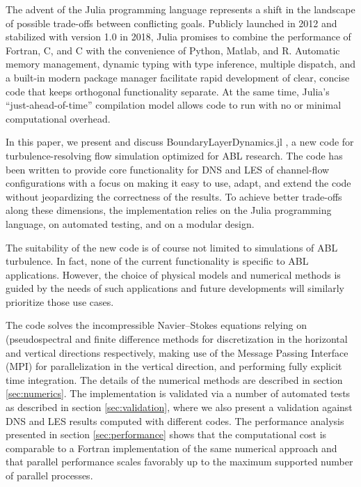 \documentclass[gmd, manuscript]{copernicus}
\begin{document}
The advent of the Julia programming language \citep{Bezanson+2017} represents a shift in the landscape of possible trade-offs between conflicting goals.
Publicly launched in 2012 and stabilized with version 1.0 in 2018, Julia promises to combine the performance of Fortran, C, and C\hspace{-.02ex}\raisebox{.3ex}{\textbf{\scriptsize ++}} with the convenience of Python, Matlab, and R.
Automatic memory management, dynamic typing with type inference, multiple dispatch, and a built-in modern package manager facilitate rapid development of clear, concise code that keeps orthogonal functionality separate.
At the same time, Julia's ``just-ahead-of-time'' compilation model allows code to run with no or minimal computational overhead.

In this paper, we present and discuss BoundaryLayerDynamics.jl \citep{Schmid2023a}, a new code for turbulence-resolving flow simulation optimized for ABL research.
The code has been written to provide core functionality for DNS and LES of channel-flow configurations with a focus on making it easy to use, adapt, and extend the code without jeopardizing the correctness of the results.
To achieve better trade-offs along these dimensions, the implementation relies on the Julia programming language, on automated testing, and on a modular design.

The suitability of the new code is of course not limited to simulations of ABL turbulence.
In fact, none of the current functionality is specific to ABL applications.
However, the choice of physical models and numerical methods is guided by the needs of such applications and future developments will similarly prioritize those use cases.

The code solves the incompressible Navier--Stokes equations relying on (pseudo\discretionary{-)}{}{)}spectral and finite difference methods for discretization in the horizontal and vertical directions respectively, making use of the Message Passing Interface (MPI) for parallelization in the vertical direction, and performing fully explicit time integration.
The details of the numerical methods are described in section \ref{sec:numerics}.
The implementation is validated via a number of automated tests as described in section \ref{sec:validation}, where we also present a validation against DNS and LES results computed with different codes.
The performance analysis presented in section \ref{sec:performance} shows that the computational cost is comparable to a Fortran implementation of the same numerical approach and that parallel performance scales favorably up to the maximum supported number of parallel processes.
\end{document}
